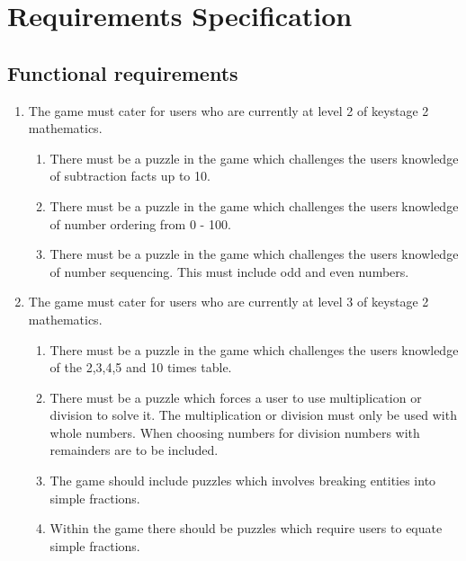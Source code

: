 \chapter{Requirements Specification}

\section{Functional requirements}
\begin{enumerate}

	\item The game must cater for users who are currently at level 2 of keystage 2 mathematics.
	\begin{enumerate}[label={1.\arabic*},nolistsep,leftmargin=*]
		\item There must be a puzzle in the game which challenges the users knowledge of subtraction facts up to 10.
		\item There must be a puzzle in the game which challenges the users knowledge of number ordering from 0 - 100.
		\item There must be a puzzle in the game which challenges the users knowledge of number sequencing. This must include odd and even numbers.
	\end{enumerate}

	\item The game must cater for users who are currently at level 3 of keystage 2 mathematics.
	\begin{enumerate}[label={2.\arabic*},nolistsep,leftmargin=*]
		\item There must be a puzzle in the game which challenges the users knowledge of the 2,3,4,5 and 10 times table.
		\item There must be a puzzle which forces a user to use multiplication or division to solve it. The multiplication or division must only be used with whole numbers. When choosing numbers for division numbers with remainders are to be included.	
		\item The game should include puzzles which involves breaking entities into simple fractions.
		\item Within the game there should be puzzles which require users to equate simple fractions.
	\end{enumerate}
	

\end{enumerate}
